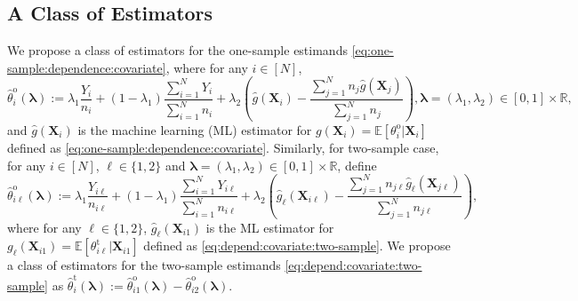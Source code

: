 \documentclass[12pt,letterpaper]{article}
\begin{document}
\subsection{A Class of Estimators}
We propose a class of estimators for the one-sample estimands \eqref{eq:one-sample:dependence:covariate}, where for any $i\in[N]$,
\begin{equation}\label{eq:two-sample:estimator:lambda:one-sample}
  \hat{\theta}_i^{\mathrm{o}}(\boldsymbol{\lambda}) := \lambda_1\frac{Y_i}{n_i} + (1-\lambda_1)\frac{\sum_{i=1}^{N}Y_i}{\sum_{i=1}^{N}n_i}+\lambda_2\left(\hat{g}(\mathbf{X}_i)-\frac{\sum_{j=1}^Nn_j\hat{g}(\mathbf{X}_{j})}{\sum_{j=1}^Nn_j}\right), \boldsymbol{\lambda}=(\lambda_1,\lambda_2)\in[0,1]\times\mathbb{R},
\end{equation}
and $\hat{g}(\mathbf{X}_i)$ is the machine learning (ML) estimator for $g(\mathbf{X}_i)=\mathbb{E}[\theta_i^{\mathrm{o}}|\mathbf{X}_i]$ defined as \eqref{eq:one-sample:dependence:covariate}. Similarly, for two-sample case, for any $i\in[N]$, $\ell\in\{1,2\}$ and $\boldsymbol{\lambda}=(\lambda_1,\lambda_2)\in[0,1]\times\mathbb{R}$, define
\begin{equation}\label{eq:ell:two-sample:estimator}
    \hat{\theta}_{i\ell}^{\mathrm{o}}(\boldsymbol{\lambda}):=\lambda_1\frac{Y_{i\ell}}{n_{i\ell}} + (1-\lambda_1)\frac{\sum_{i=1}^{N}Y_{i\ell}}{\sum_{i=1}^{N}n_{i\ell}}+\lambda_2\left(\hat{g}_{\ell}(\mathbf{X}_{i\ell})-\frac{\sum_{j=1}^Nn_{j\ell}\hat{g}_{\ell}(\mathbf{X}_{j\ell})}{\sum_{j=1}^Nn_{j\ell}}\right), 
\end{equation}
where for any $\ell\in\{1,2\}$, $\hat{g}_{\ell}(\mathbf{X}_{i1})$ is the ML estimator for $g_{\ell}(\mathbf{X}_{i1})=\mathbb{E}[\theta_{i\ell}^{\mathrm{t}}|\mathbf{X}_{i1}]$ defined as \eqref{eq:depend:covariate:two-sample}. We propose a class of estimators for the two-sample estimands \eqref{eq:depend:covariate:two-sample} as $\hat{\theta}_i^{\mathrm{t}}(\boldsymbol\lambda) := \hat{\theta}_{i1}^{\mathrm{o}}(\boldsymbol{\lambda}) - \hat{\theta}_{i2}^{\mathrm{o}}(\boldsymbol{\lambda})$. 
\end{document}
